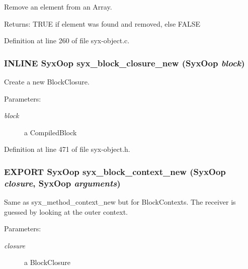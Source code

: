 Remove an element from an Array.

\begin{Desc}
\item[Returns:]TRUE if element was found and removed, else FALSE \end{Desc}


Definition at line 260 of file syx-object.c.\hypertarget{syx-object_8h_cb77fae0f91d128285e504c1959f9fc9}{
\subsubsection{\setlength{\rightskip}{0pt plus 5cm}INLINE {\bf SyxOop} syx\_\-block\_\-closure\_\-new ({\bf SyxOop} {\em block})}}
\label{syx-object_8h_cb77fae0f91d128285e504c1959f9fc9}


Create a new BlockClosure.

\begin{Desc}
\item[Parameters:]
\begin{description}
\item[{\em block}]a CompiledBlock \end{description}
\end{Desc}


Definition at line 471 of file syx-object.h.\hypertarget{syx-object_8h_e8dbdd7232dd6da7e16ad59ac26c0cbe}{
\subsubsection{\setlength{\rightskip}{0pt plus 5cm}EXPORT {\bf SyxOop} syx\_\-block\_\-context\_\-new ({\bf SyxOop} {\em closure}, \/  {\bf SyxOop} {\em arguments})}}
\label{syx-object_8h_e8dbdd7232dd6da7e16ad59ac26c0cbe}


Same as syx\_\-method\_\-context\_\-new but for BlockContexts. The receiver is guessed by looking at the outer context.

\begin{Desc}
\item[Parameters:]
\begin{description}
\item[{\em closure}]a BlockClosure \end{description}
\end{Desc}


